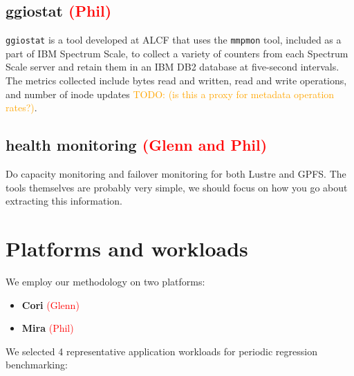 \documentclass[conference,10pt,compsocconf]{IEEEtran}
\newcommand{\assign}[1]{\textcolor{red}{(#1)}}
\newcommand{\todo}[1]{\textcolor{Orange}{TODO: #1}}
\begin{document}
\subsection{ggiostat \assign{Phil}} \label{sec:methods/ggiostat}

\texttt{ggiostat} is a tool developed at ALCF that uses the \texttt{mmpmon}
tool, included as a part of IBM Spectrum Scale, to collect a variety of counters
from each Spectrum Scale server and retain them in an IBM DB2 database at
five-second intervals.  The metrics collected include bytes read and written,
read and write operations, and number of inode updates \todo{(is this
a proxy for metadata operation rates?)}.

\subsection{health monitoring \assign{Glenn and Phil}} \label{sec:methods/health}

Do capacity monitoring and failover monitoring for both Lustre and GPFS.  The
tools themselves are probably very simple, we should focus on how you go
about extracting this information.

\section{Platforms and workloads} \label{sec:platforms}

We employ our methodology on two platforms:

\begin{itemize}
\item \textbf{Cori} \assign{Glenn}
\item \textbf{Mira} \assign{Phil}
\end{itemize}

We selected 4 representative application workloads for periodic regression
benchmarking:
\end{document}
